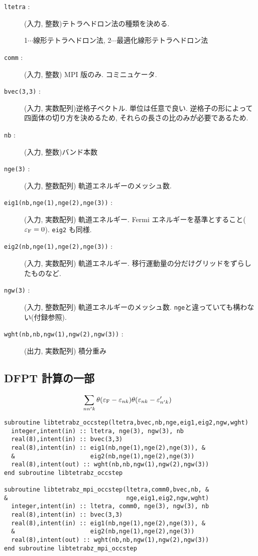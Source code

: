 \documentclass[12pt]{jarticle}
\begin{document}
\begin{description}
\item[\texttt{ltetra} : ] (入力, 整数)テトラへドロン法の種類を決める. 

  1$\cdots$線形テトラへドロン法,
  2$\cdots$最適化線形テトラへドロン法
\item[\texttt{comm} : ] (入力, 整数) MPI 版のみ. コミニュケータ. 
\item[\texttt{bvec(3,3)} : ] (入力, 実数配列)逆格子ベクトル. 単位は任意で良い. 
  逆格子の形によって四面体の切り方を決めるため, それらの長さの比のみが必要であるため. 
\item[\texttt{nb} : ] (入力, 整数)バンド本数
\item[\texttt{nge(3)} : ] (入力, 整数配列) 軌道エネルギーのメッシュ数. 
\item[\texttt{eig1(nb,nge(1),nge(2),nge(3))} : ] (入力, 実数配列) 軌道エネルギー. 
  Fermi エネルギーを基準とすること($\varepsilon_{\rm F}=0$). \verb|eig2| も同様. 
\item[\texttt{eig2(nb,nge(1),nge(2),nge(3))} : ] (入力, 実数配列) 軌道エネルギー. 
  移行運動量の分だけグリッドをずらしたものなど. 
\item[\texttt{ngw(3)} : ] (入力, 整数配列) 軌道エネルギーのメッシュ数. 
  \verb|nge|と違っていても構わない(付録参照). 
\item[\texttt{wght(nb,nb,ngw(1),ngw(2),ngw(3))} : ] (出力, 実数配列) 積分重み
\end{description}

\newpage

\subsection{DFPT 計算の一部}

\begin{align}
&\sum_{n n' k} \theta(\varepsilon_{\rm F} - \varepsilon_{n k})
\theta(\varepsilon_{n k} - \varepsilon'_{n' k})
\end{align}

\begin{verbatim}
subroutine libtetrabz_occstep(ltetra,bvec,nb,nge,eig1,eig2,ngw,wght)
  integer,intent(in) :: ltetra, nge(3), ngw(3), nb
  real(8),intent(in) :: bvec(3,3)
  real(8),intent(in) :: eig1(nb,nge(1),nge(2),nge(3)), &
  &                     eig2(nb,nge(1),nge(2),nge(3))
  real(8),intent(out) :: wght(nb,nb,ngw(1),ngw(2),ngw(3))
end subroutine libtetrabz_occstep

subroutine libtetrabz_mpi_occstep(ltetra,comm0,bvec,nb, &
&                                 nge,eig1,eig2,ngw,wght)
  integer,intent(in) :: ltetra, comm0, nge(3), ngw(3), nb
  real(8),intent(in) :: bvec(3,3)
  real(8),intent(in) :: eig1(nb,nge(1),nge(2),nge(3)), &
  &                     eig2(nb,nge(1),nge(2),nge(3))
  real(8),intent(out) :: wght(nb,nb,ngw(1),ngw(2),ngw(3))
end subroutine libtetrabz_mpi_occstep
\end{verbatim}
\end{document}
